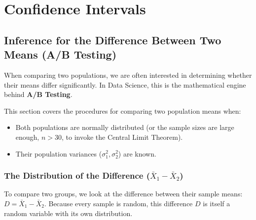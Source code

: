 \section{Confidence Intervals}


\subsection{Inference for the Difference Between Two Means (A/B Testing)}

When comparing two populations, we are often interested in determining whether their means differ significantly. In Data Science, this is the mathematical engine behind \textbf{A/B Testing}. 

This section covers the procedures for comparing two population means when:
\begin{itemize}
    \item Both populations are normally distributed (or the sample sizes are large enough, $n > 30$, to invoke the Central Limit Theorem).
    \item Their population variances ($\sigma_1^2, \sigma_2^2$) are known.
\end{itemize}

\subsubsection{The Distribution of the Difference ($\bar{X}_1 - \bar{X}_2$)}

To compare two groups, we look at the difference between their sample means: $D = \bar{X}_1 - \bar{X}_2$. Because every sample is random, this difference $D$ is itself a random variable with its own distribution.

